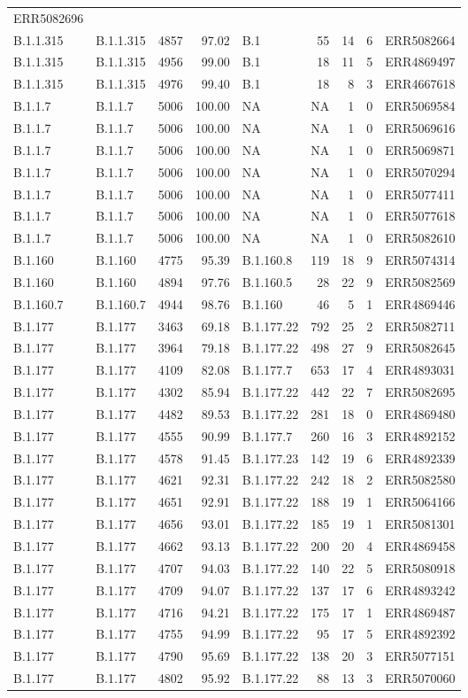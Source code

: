 \documentclass[
]{article}
\begin{document}
\begin{longtable}[]{@{}llrrlrrrl@{}}
ERR5082696\tabularnewline
B.1.1.315 & B.1.1.315 & 4857 & 97.02 & B.1 & 55 & 14 & 6 &
ERR5082664\tabularnewline
B.1.1.315 & B.1.1.315 & 4956 & 99.00 & B.1 & 18 & 11 & 5 &
ERR4869497\tabularnewline
B.1.1.315 & B.1.1.315 & 4976 & 99.40 & B.1 & 18 & 8 & 3 &
ERR4667618\tabularnewline
B.1.1.7 & B.1.1.7 & 5006 & 100.00 & NA & NA & 1 & 0 &
ERR5069584\tabularnewline
B.1.1.7 & B.1.1.7 & 5006 & 100.00 & NA & NA & 1 & 0 &
ERR5069616\tabularnewline
B.1.1.7 & B.1.1.7 & 5006 & 100.00 & NA & NA & 1 & 0 &
ERR5069871\tabularnewline
B.1.1.7 & B.1.1.7 & 5006 & 100.00 & NA & NA & 1 & 0 &
ERR5070294\tabularnewline
B.1.1.7 & B.1.1.7 & 5006 & 100.00 & NA & NA & 1 & 0 &
ERR5077411\tabularnewline
B.1.1.7 & B.1.1.7 & 5006 & 100.00 & NA & NA & 1 & 0 &
ERR5077618\tabularnewline
B.1.1.7 & B.1.1.7 & 5006 & 100.00 & NA & NA & 1 & 0 &
ERR5082610\tabularnewline
B.1.160 & B.1.160 & 4775 & 95.39 & B.1.160.8 & 119 & 18 & 9 &
ERR5074314\tabularnewline
B.1.160 & B.1.160 & 4894 & 97.76 & B.1.160.5 & 28 & 22 & 9 &
ERR5082569\tabularnewline
B.1.160.7 & B.1.160.7 & 4944 & 98.76 & B.1.160 & 46 & 5 & 1 &
ERR4869446\tabularnewline
B.1.177 & B.1.177 & 3463 & 69.18 & B.1.177.22 & 792 & 25 & 2 &
ERR5082711\tabularnewline
B.1.177 & B.1.177 & 3964 & 79.18 & B.1.177.22 & 498 & 27 & 9 &
ERR5082645\tabularnewline
B.1.177 & B.1.177 & 4109 & 82.08 & B.1.177.7 & 653 & 17 & 4 &
ERR4893031\tabularnewline
B.1.177 & B.1.177 & 4302 & 85.94 & B.1.177.22 & 442 & 22 & 7 &
ERR5082695\tabularnewline
B.1.177 & B.1.177 & 4482 & 89.53 & B.1.177.22 & 281 & 18 & 0 &
ERR4869480\tabularnewline
B.1.177 & B.1.177 & 4555 & 90.99 & B.1.177.7 & 260 & 16 & 3 &
ERR4892152\tabularnewline
B.1.177 & B.1.177 & 4578 & 91.45 & B.1.177.23 & 142 & 19 & 6 &
ERR4892339\tabularnewline
B.1.177 & B.1.177 & 4621 & 92.31 & B.1.177.22 & 242 & 18 & 2 &
ERR5082580\tabularnewline
B.1.177 & B.1.177 & 4651 & 92.91 & B.1.177.22 & 188 & 19 & 1 &
ERR5064166\tabularnewline
B.1.177 & B.1.177 & 4656 & 93.01 & B.1.177.22 & 185 & 19 & 1 &
ERR5081301\tabularnewline
B.1.177 & B.1.177 & 4662 & 93.13 & B.1.177.22 & 200 & 20 & 4 &
ERR4869458\tabularnewline
B.1.177 & B.1.177 & 4707 & 94.03 & B.1.177.22 & 140 & 22 & 5 &
ERR5080918\tabularnewline
B.1.177 & B.1.177 & 4709 & 94.07 & B.1.177.22 & 137 & 17 & 6 &
ERR4893242\tabularnewline
B.1.177 & B.1.177 & 4716 & 94.21 & B.1.177.22 & 175 & 17 & 1 &
ERR4869487\tabularnewline
B.1.177 & B.1.177 & 4755 & 94.99 & B.1.177.22 & 95 & 17 & 5 &
ERR4892392\tabularnewline
B.1.177 & B.1.177 & 4790 & 95.69 & B.1.177.22 & 138 & 20 & 3 &
ERR5077151\tabularnewline
B.1.177 & B.1.177 & 4802 & 95.92 & B.1.177.22 & 88 & 13 & 3 &
ERR5070060\tabularnewline

\end{longtable}
\end{document}

